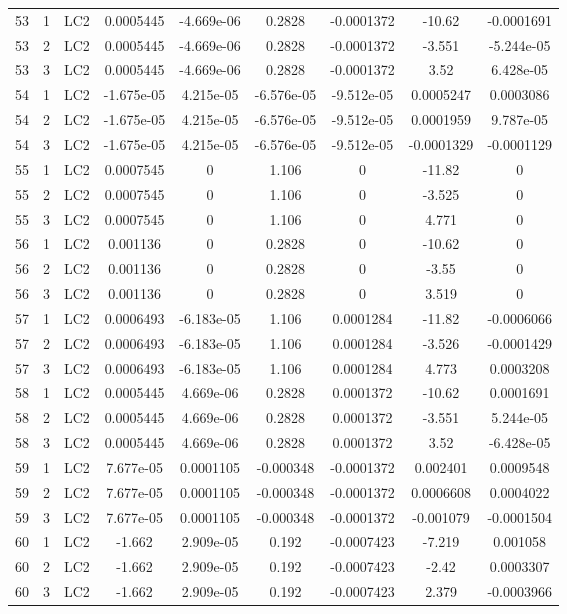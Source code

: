 \documentclass{article}%
\begin{document}
\begin{longtable}{| c c c | c c c c c c |}
53&1&LC2&0.0005445&{-}4.669e{-}06&0.2828&{-}0.0001372&{-}10.62&{-}0.0001691\\%
53&2&LC2&0.0005445&{-}4.669e{-}06&0.2828&{-}0.0001372&{-}3.551&{-}5.244e{-}05\\%
53&3&LC2&0.0005445&{-}4.669e{-}06&0.2828&{-}0.0001372&3.52&6.428e{-}05\\%
54&1&LC2&{-}1.675e{-}05&4.215e{-}05&{-}6.576e{-}05&{-}9.512e{-}05&0.0005247&0.0003086\\%
54&2&LC2&{-}1.675e{-}05&4.215e{-}05&{-}6.576e{-}05&{-}9.512e{-}05&0.0001959&9.787e{-}05\\%
54&3&LC2&{-}1.675e{-}05&4.215e{-}05&{-}6.576e{-}05&{-}9.512e{-}05&{-}0.0001329&{-}0.0001129\\%
55&1&LC2&0.0007545&0&1.106&0&{-}11.82&0\\%
55&2&LC2&0.0007545&0&1.106&0&{-}3.525&0\\%
55&3&LC2&0.0007545&0&1.106&0&4.771&0\\%
56&1&LC2&0.001136&0&0.2828&0&{-}10.62&0\\%
56&2&LC2&0.001136&0&0.2828&0&{-}3.55&0\\%
56&3&LC2&0.001136&0&0.2828&0&3.519&0\\%
57&1&LC2&0.0006493&{-}6.183e{-}05&1.106&0.0001284&{-}11.82&{-}0.0006066\\%
57&2&LC2&0.0006493&{-}6.183e{-}05&1.106&0.0001284&{-}3.526&{-}0.0001429\\%
57&3&LC2&0.0006493&{-}6.183e{-}05&1.106&0.0001284&4.773&0.0003208\\%
58&1&LC2&0.0005445&4.669e{-}06&0.2828&0.0001372&{-}10.62&0.0001691\\%
58&2&LC2&0.0005445&4.669e{-}06&0.2828&0.0001372&{-}3.551&5.244e{-}05\\%
58&3&LC2&0.0005445&4.669e{-}06&0.2828&0.0001372&3.52&{-}6.428e{-}05\\%
59&1&LC2&7.677e{-}05&0.0001105&{-}0.000348&{-}0.0001372&0.002401&0.0009548\\%
59&2&LC2&7.677e{-}05&0.0001105&{-}0.000348&{-}0.0001372&0.0006608&0.0004022\\%
59&3&LC2&7.677e{-}05&0.0001105&{-}0.000348&{-}0.0001372&{-}0.001079&{-}0.0001504\\%
60&1&LC2&{-}1.662&2.909e{-}05&0.192&{-}0.0007423&{-}7.219&0.001058\\%
60&2&LC2&{-}1.662&2.909e{-}05&0.192&{-}0.0007423&{-}2.42&0.0003307\\%
60&3&LC2&{-}1.662&2.909e{-}05&0.192&{-}0.0007423&2.379&{-}0.0003966\\%

\end{longtable}
\end{document}
